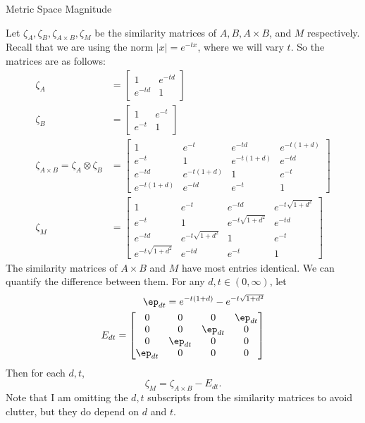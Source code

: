 \documentclass[12pt]{pom_thesis}
\begin{document}
\begin{chapter}{Metric Space Magnitude}
\begin{examp}
Let $\zeta_A, \zeta_B, \zeta_{A \times B}, \zeta_M$ be the similarity matrices of $A, B, A \times B$, and $M$ respectively. Recall that we are using the norm $|x| = e^{-tx}$, where we will vary $t$. So the matrices are as follows:
\begin{align*}
\zeta_A &= 
\begin{bmatrix}
1 & e^{-td} \\
e^{-td} & 1
\end{bmatrix}\\
\zeta_B &= 
\begin{bmatrix}
1 & e^{-t} \\
e^{-t} & 1
\end{bmatrix}\\
\zeta_{A \times B} = \zeta_A \otimes \zeta_B &= 
\begin{bmatrix}
1 & e^{-t} & e^{- td} & e^{-t(1 + d)}\\
e^{-t} & 1 & e^{-t(1 + d)}& e^{- td}\\
e^{-td} & e^{-t(1 + d)} & 1 & e^{-t}\\
e^{-t(1 + d)} & e^{-td} & e^{-t} & 1
\end{bmatrix}\\
\zeta_M &= 
\begin{bmatrix}
1 & e^{-t} & e^{- td} & e^{-t\sqrt{1 + d^2}}\\
e^{-t} & 1 &  e^{-t\sqrt{1 + d^2}}& e^{- td}\\
e^{-td} &  e^{-t\sqrt{1 + d^2}} & 1 & e^{-t}\\
e^{-t\sqrt{1 + d^2}}& e^{-td} & e^{-t} & 1
\end{bmatrix}
\end{align*}
The similarity matrices of $A \times B$ and $M$ have most entries identical. We can quantify the difference between them. For any $d, t \in (0, \infty)$, let 
\begin{align*}
\ep_{dt} = e^{-t(1 + d)} - e^{-t\sqrt{1 + d^2}}\\
E_{dt} = \begin{bmatrix}
0 & 0 & 0 & \ep_{dt} \\
0 & 0 & \ep_{dt} & 0 \\
0 & \ep_{dt} & 0 & 0 \\
\ep_{dt} & 0 & 0 & 0
\end{bmatrix}
\end{align*}
Then for each $d,t$,
\[
\zeta_M = \zeta_{A \times B} - E_{dt}.
\]
Note that I am omitting the $d,t$ subscripts from the similarity matrices to avoid clutter, but they do depend on $d$ and $t$.


\end{examp}
\end{chapter}
\end{document}
